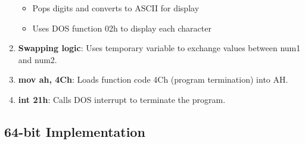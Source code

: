 \documentclass[12pt,a4paper]{article}
\begin{document}
\begin{enumerate}
\begin{itemize}
    \item Pops digits and converts to ASCII for display
    \item Uses DOS function 02h to display each character
    \end{itemize}
\item \textbf{Swapping logic}: Uses temporary variable to exchange values between num1 and num2.
\item \textbf{mov ah, 4Ch}: Loads function code 4Ch (program termination) into AH.
\item \textbf{int 21h}: Calls DOS interrupt to terminate the program.
\end{enumerate}

\subsection{64-bit Implementation}
\end{document}
